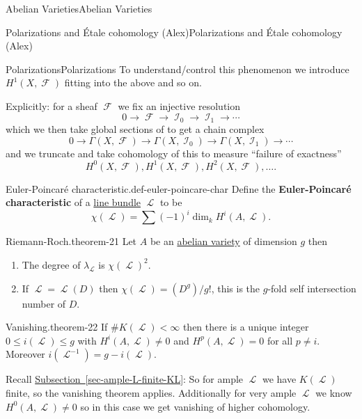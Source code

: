 \documentclass[10pt,]{book}
\newcommand{\terminology}[1]{\textbf{#1}}
\numberwithin{equation}{section}
\newcommand{\sheaf}[1]{\operatorname{\mathcal{#1}}}
\newcommand{\lt}{<}
\begin{document}
\begin{chapterptx}{Abelian Varieties}{}{Abelian Varieties}{}{}
\begin{sectionptx}{Polarizations and Étale cohomology (Alex)}{}{Polarizations and Étale cohomology (Alex)}{}{}
\begin{subsectionptx}{Polarizations}{}{Polarizations}{}{}
\hypertarget{p-252}{}%
To understand/control this phenomenon we introduce \(H^1(X, \sheaf F)\) fitting into the above and so on.%
\par
\hypertarget{p-253}{}%
Explicitly: for a sheaf \(\sheaf F\) we fix an injective resolution%
\begin{equation*}
0\to \sheaf F \to \sheaf I_0 \to \sheaf I_1 \to \cdots
\end{equation*}
which we then take global sections of to get a chain complex%
\begin{equation*}
0\to \Gamma(X,\sheaf F) \to \Gamma(X,\sheaf I_0) \to \Gamma(X,\sheaf I_1) \to \cdots
\end{equation*}
and we truncate and take cohomology of this to measure ``failure of exactness''%
\begin{equation*}
H^0(X, \sheaf F) , H^1(X, \sheaf F) , H^2(X, \sheaf F) , \ldots\text{.}
\end{equation*}
%
\begin{definition}{Euler-Poincaré characteristic.}{def-euler-poincare-char}%
\hypertarget{p-254}{}%
Define the \terminology{Euler-Poincaré characteristic} of a \hyperref[def-line-bundle]{line bundle} \(\sheaf L\) to be%
\begin{equation*}
\chi(\sheaf L) = \sum (-1)^i \dim_k H^i(A,\sheaf L)\text{.}
\end{equation*}
%
\end{definition}
\begin{theorem}{Riemann-Roch.}{}{theorem-21}%
\hypertarget{p-255}{}%
Let \(A\) be an \hyperref[def-buntes-abvar]{abelian variety} of dimension \(g\) then\leavevmode%
\begin{enumerate}
\item\hypertarget{li-42}{}The degree of \(\lambda_{\sheaf L}\) is \(\chi(\sheaf L)^2\).%
\item\hypertarget{li-43}{}If \(\sheaf L = \sheaf L(D)\) then \(\chi(\sheaf L) = (D^g)/g!\), this is the \(g\)-fold self intersection number of \(D\).%
\end{enumerate}
%
\end{theorem}
\begin{theorem}{Vanishing.}{}{theorem-22}%
\hypertarget{p-256}{}%
If \(\#K( \sheaf L)\lt \infty\) then there is a unique integer \(0\le i(\sheaf L) \le g\) with \(H^i(A, \sheaf L) \ne  0\) and \(H^p(A, \sheaf L) = 0\) for all \(p \ne i\). Moreover \(i(\sheaf L^{-1}) = g - i(\sheaf L)\).%
\end{theorem}
\hypertarget{p-257}{}%
Recall \hyperref[sec-ample-L-finite-KL]{Subsection~\ref{sec-ample-L-finite-KL}}: So for ample \(\sheaf L\) we have \(K(\sheaf L)\) finite, so the vanishing theorem applies. Additionally for very ample \(\sheaf L\) we know \(H^0(A,\sheaf L) \ne 0\) so in this case we get vanishing of higher cohomology.%

\end{subsectionptx}
\end{sectionptx}
\end{chapterptx}
\end{document}
